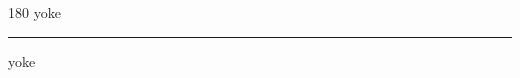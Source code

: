 
\begin{frame}
\begin{center}
\begin{turn}{180}
{\fontsize{2.5cm}{1em}\selectfont yoke}
\end{turn}
\vspace{1em}\par  
\hrule
\vspace{1em}\par  
{\fontsize{2.5cm}{1em}\selectfont yoke}
\end{center}
\end{frame}
